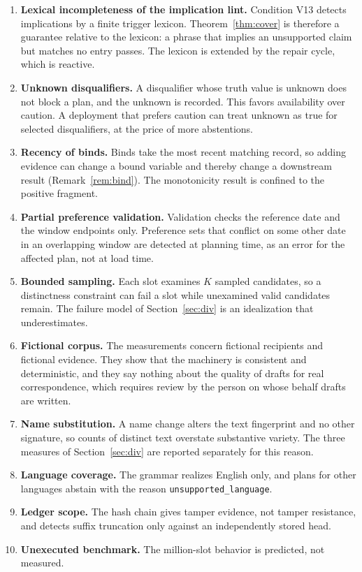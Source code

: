 \documentclass[11pt]{article}
\theoremstyle{definition}
\theoremstyle{remark}
\newcommand{\code}[1]{\texttt{#1}}
\begin{document}
\begin{enumerate}[label=\textbf{L\arabic*.},leftmargin=*]
\item \textbf{Lexical incompleteness of the implication lint.} Condition V13 detects implications by a finite trigger lexicon. Theorem~\ref{thm:cover} is therefore a guarantee relative to the lexicon: a phrase that implies an unsupported claim but matches no entry passes. The lexicon is extended by the repair cycle, which is reactive.
\item \textbf{Unknown disqualifiers.} A disqualifier whose truth value is unknown does not block a plan, and the unknown is recorded. This favors availability over caution. A deployment that prefers caution can treat unknown as true for selected disqualifiers, at the price of more abstentions.
\item \textbf{Recency of binds.} Binds take the most recent matching record, so adding evidence can change a bound variable and thereby change a downstream result (Remark~\ref{rem:bind}). The monotonicity result is confined to the positive fragment.
\item \textbf{Partial preference validation.} Validation checks the reference date and the window endpoints only. Preference sets that conflict on some other date in an overlapping window are detected at planning time, as an error for the affected plan, not at load time.
\item \textbf{Bounded sampling.} Each slot examines $K$ sampled candidates, so a distinctness constraint can fail a slot while unexamined valid candidates remain. The failure model of Section~\ref{sec:div} is an idealization that underestimates.
\item \textbf{Fictional corpus.} The measurements concern fictional recipients and fictional evidence. They show that the machinery is consistent and deterministic, and they say nothing about the quality of drafts for real correspondence, which requires review by the person on whose behalf drafts are written.
\item \textbf{Name substitution.} A name change alters the text fingerprint and no other signature, so counts of distinct text overstate substantive variety. The three measures of Section~\ref{sec:div} are reported separately for this reason.
\item \textbf{Language coverage.} The grammar realizes English only, and plans for other languages abstain with the reason \code{unsupported\_language}.
\item \textbf{Ledger scope.} The hash chain gives tamper evidence, not tamper resistance, and detects suffix truncation only against an independently stored head.
\item \textbf{Unexecuted benchmark.} The million-slot behavior is predicted, not measured.
\end{enumerate}
\end{document}
